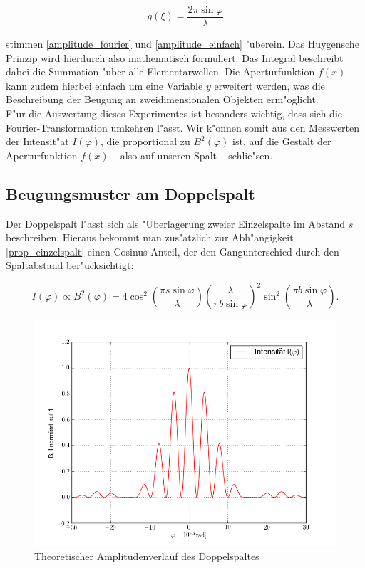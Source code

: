		\begin{equation}
			g(\xi) = \frac{2 \pi \sin{\varphi}}{\lambda}
		\end{equation}

		stimmen \eqref{amplitude_fourier} und \eqref{amplitude_einfach} "uberein.
		Das Huygensche Prinzip wird hierdurch also mathematisch formuliert.
		Das Integral beschreibt dabei die Summation "uber alle Elementarwellen.
		Die Aperturfunktion $f(x)$ kann zudem hierbei einfach um eine Variable $y$ erweitert werden,
		was die Beschreibung der Beugung an zweidimensionalen Objekten erm"oglicht. \\
		F"ur die Auswertung dieses Experimentes ist besonders wichtig, dass sich die Fourier-Transformation umkehren l"asst.
		Wir k"onnen somit aus den Messwerten der Intensit"at $I(\varphi)$,
		die proportional zu $B^2(\varphi)$ ist, auf die Gestalt der Aperturfunktion $f(x)$
		--  also auf unseren Spalt -- schlie"sen.
		
	\subsection{Beugungsmuster am Doppelspalt}
		\label{sec:muster_doppelspalt}

		Der Doppelspalt l"asst sich als "Uberlagerung zweier Einzelspalte im Abstand $s$ beschreiben.
		Hieraus bekommt man zus"atzlich zur Abh"angigkeit \eqref{prop_einzelspalt} einen Cosinus-Anteil,
		der den Gangunterschied durch den Spaltabstand ber"ucksichtigt:

		\begin{equation}
			I(\varphi) \propto B^2(\varphi) = 
			4 \cos^2{\left( \frac{\pi s \sin{\varphi}}{\lambda} \right)}
			\left( \frac{\lambda}{\pi b \sin{\varphi}} \right)^2
			\sin^2{\left( \frac{\pi b \sin{\varphi}}{\lambda} \right)} .
			\label{prop_doppelspalt}
		\end{equation}

		\begin{figure}[h]
			\centering
			\includegraphics[width = 15cm]{theorie_2.png}
			\caption{Theoretischer Amplitudenverlauf des Doppelspaltes}
			\label{theoriekurve_doppelspalt}
		\end{figure}
